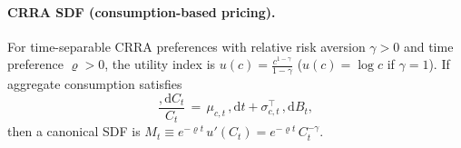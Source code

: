 ﻿\documentclass[11pt,letterpaper,oneside]{article}
\numberwithin{equation}{section}
\newcommand{\1}{\mathbf{1}}
\newcommand{\diff}{,\mathrm{d}}
\begin{document}
\paragraph{CRRA SDF (consumption-based pricing).}\label{sec:crra}

For time-separable CRRA preferences with relative risk aversion $\gamma>0$ and time preference $\varrho>0$, the utility index is $u(c)=\tfrac{c^{1-\gamma}}{1-\gamma}$ ($u(c)=\log c$ if $\gamma=1$). If aggregate consumption satisfies
\[
\frac{\diff C_t}{C_t} \,=\, \mu_{c,t}\,\diff t + \sigma_{c,t}^{\top}\,\diff B_t,
\]
then a canonical SDF is $M_t \equiv e^{-\varrho t}\,u'(C_t)= e^{-\varrho t}\,C_t^{-\gamma}$.
\end{document}
